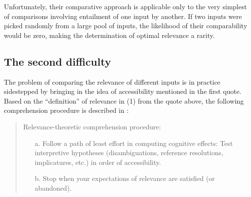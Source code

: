 Unfortunately, their comparative approach is applicable only to the very simplest of comparisons involving entailment of one input by another. If two inputs were picked randomly from a large pool of inputs, the likelihood of their comparability would be zero, making the determination of optimal relevance a rarity.




\subsection{The second difficulty}

The problem of comparing the relevance of different inputs is in practice sidestepped by bringing in the idea of accessibility mentioned in the first quote. Based on the ``definition'' of relevance in (1) from the quote above, the following comprehension procedure is described in \citet[613]{sw:rt}:

\begin{quote}
\noindent Relevance-theoretic comprehension procedure:
\begin{itemize}
\item[a.] Follow a path of least effort in computing cognitive effects: Test interpretive hypotheses (disambiguations, reference resolutions, implicatures, etc.) in order of accessibility.
\item[b.] Stop when your expectations of relevance are satisfied (or abandoned).
\end{itemize}
\end{quote}

